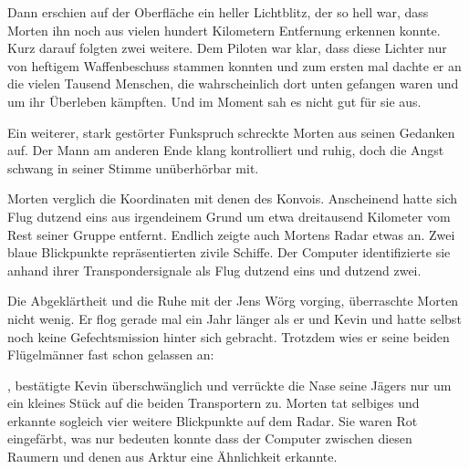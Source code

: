\par

Dann erschien auf der Oberfläche ein heller Lichtblitz, der so hell war, dass Morten ihn noch aus vielen hundert Kilometern Entfernung erkennen konnte. Kurz darauf folgten zwei weitere. Dem Piloten war klar, dass diese Lichter nur von heftigem Waffenbeschuss stammen konnten und zum ersten mal dachte er an die vielen Tausend Menschen, die wahrscheinlich dort unten gefangen waren und um ihr Überleben kämpften. Und im Moment sah es nicht gut für sie aus.

\par

Ein weiterer, stark gestörter Funkspruch schreckte Morten aus seinen Gedanken auf. Der Mann am anderen Ende klang kontrolliert und ruhig, doch die Angst schwang in seiner Stimme unüberhörbar mit. 

\par

Morten verglich die Koordinaten mit denen des Konvois. Anscheinend hatte sich Flug dutzend eins aus irgendeinem Grund um etwa dreitausend Kilometer vom Rest seiner Gruppe entfernt. Endlich zeigte auch Mortens Radar etwas an. Zwei blaue Blickpunkte repräsentierten zivile Schiffe. Der Computer identifizierte sie anhand ihrer Transpondersignale als Flug dutzend eins und dutzend zwei.

\par


\par

Die Abgeklärtheit und die Ruhe mit der Jens Wörg vorging, überraschte Morten nicht wenig. Er flog gerade mal ein Jahr länger als er und Kevin und hatte selbst noch keine Gefechtsmission hinter sich gebracht. Trotzdem wies er seine beiden Flügelmänner fast schon gelassen an: 

\par

, bestätigte Kevin überschwänglich und verrückte die Nase seine Jägers nur um ein kleines Stück auf die beiden Transportern zu. Morten tat selbiges und erkannte sogleich vier weitere Blickpunkte auf dem Radar. Sie waren Rot eingefärbt, was nur bedeuten konnte dass der Computer zwischen diesen Raumern und denen aus Arktur eine Ähnlichkeit erkannte.

